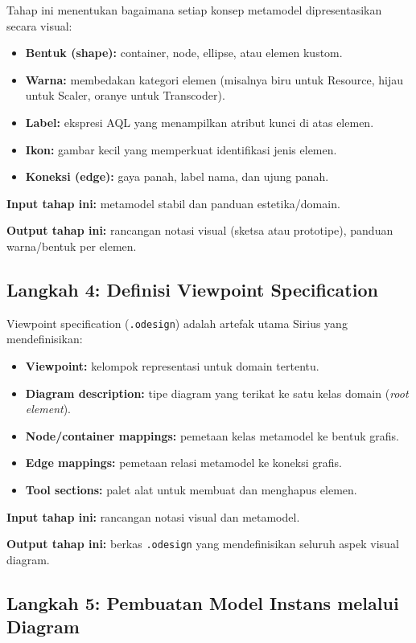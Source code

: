 Tahap ini menentukan bagaimana setiap konsep metamodel dipresentasikan secara visual:
\begin{itemize}
  \item \textbf{Bentuk (shape):} container, node, ellipse, atau elemen kustom.
  \item \textbf{Warna:} membedakan kategori elemen (misalnya biru untuk Resource, hijau untuk Scaler, oranye untuk Transcoder).
  \item \textbf{Label:} ekspresi AQL yang menampilkan atribut kunci di atas elemen.
  \item \textbf{Ikon:} gambar kecil yang memperkuat identifikasi jenis elemen.
  \item \textbf{Koneksi (edge):} gaya panah, label nama, dan ujung panah.
\end{itemize}

\textbf{Input tahap ini:} metamodel stabil dan panduan estetika/domain.

\textbf{Output tahap ini:} rancangan notasi visual (sketsa atau prototipe), panduan warna/bentuk per elemen.

\subsection{Langkah 4: Definisi Viewpoint Specification}

Viewpoint specification (\texttt{.odesign}) adalah artefak utama Sirius yang mendefinisikan:
\begin{itemize}
  \item \textbf{Viewpoint:} kelompok representasi untuk domain tertentu.
  \item \textbf{Diagram description:} tipe diagram yang terikat ke satu kelas domain (\textit{root element}).
  \item \textbf{Node/container mappings:} pemetaan kelas metamodel ke bentuk grafis.
  \item \textbf{Edge mappings:} pemetaan relasi metamodel ke koneksi grafis.
  \item \textbf{Tool sections:} palet alat untuk membuat dan menghapus elemen.
\end{itemize}

\textbf{Input tahap ini:} rancangan notasi visual dan metamodel.

\textbf{Output tahap ini:} berkas \texttt{.odesign} yang mendefinisikan seluruh aspek visual diagram.

\subsection{Langkah 5: Pembuatan Model Instans melalui Diagram}

